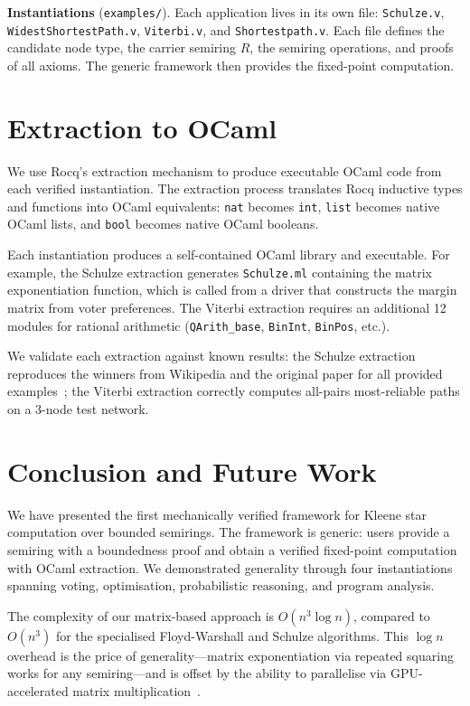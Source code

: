 \documentclass[a4paper,UKenglish,cleveref, autoref, thm-restate, anonymous]{lipics-v2021}
\begin{document}
\textbf{Instantiations} (\texttt{examples/}).
Each application lives in its own file: \texttt{Schulze.v},
\texttt{WidestShortestPath.v}, \texttt{Viterbi.v}, and
\texttt{Shortestpath.v}. Each file defines the candidate node type, the
carrier semiring $R$, the semiring operations, and proofs of all axioms.
The generic framework then provides the fixed-point computation.

\section{Extraction to OCaml}
\label{sec:extraction}

We use Rocq's extraction mechanism to produce executable OCaml code from
each verified instantiation. The extraction process translates Rocq
inductive types and functions into OCaml equivalents:
\texttt{nat} becomes \texttt{int}, \texttt{list} becomes native OCaml
lists, and \texttt{bool} becomes native OCaml booleans.

Each instantiation produces a self-contained OCaml library and executable.
For example, the Schulze extraction generates \texttt{Schulze.ml} containing
the matrix exponentiation function, which is called from a driver that
constructs the margin matrix from voter preferences. The Viterbi extraction
requires an additional 12 modules for rational arithmetic (\texttt{QArith\_base},
\texttt{BinInt}, \texttt{BinPos}, etc.).

We validate each extraction against known results: the Schulze extraction
reproduces the winners from Wikipedia and the original paper for all
provided examples~\cite{schulze-wikipedia,schulze2011new}; the Viterbi
extraction correctly computes all-pairs most-reliable paths on a 3-node
test network.

\section{Conclusion and Future Work}
\label{sec:conclusion}

We have presented the first mechanically verified framework for Kleene
star computation over bounded semirings. The framework is generic: users
provide a semiring with a boundedness proof and obtain a verified
fixed-point computation with OCaml extraction. We demonstrated generality
through four instantiations spanning voting, optimisation, probabilistic
reasoning, and program analysis.

The complexity of our matrix-based approach is $O(n^3 \log n)$, compared
to $O(n^3)$ for the specialised Floyd-Warshall and Schulze algorithms.
This $\log n$ overhead is the price of generality---matrix exponentiation
via repeated squaring works for any semiring---and is offset by the
ability to parallelise via GPU-accelerated matrix multiplication~\cite{chang2022revisiting}.
\end{document}
